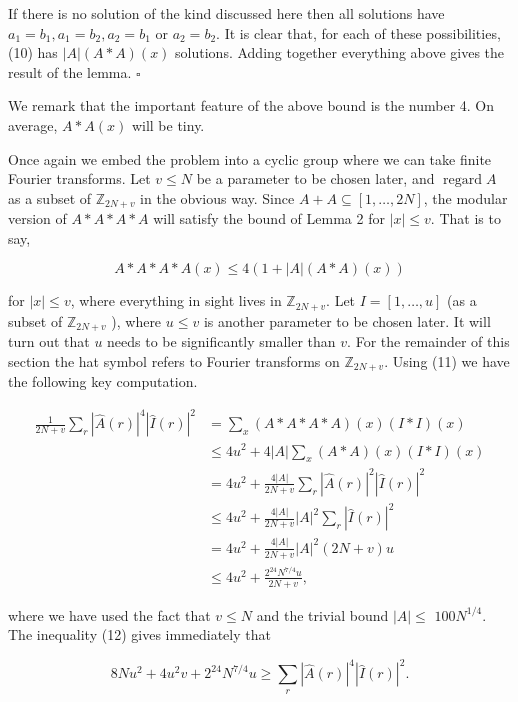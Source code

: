 \documentclass[10pt]{article}
\begin{document}
If there is no solution of the kind discussed here then all solutions have $a_{1}=b_{1}, a_{1}=b_{2}, a_{2}=b_{1}$ or $a_{2}=b_{2}$. It is clear that, for each of these possibilities, (10) has $|A|(A * A)(x)$ solutions. Adding together everything above gives the result of the lemma. \(\square\)

We remark that the important feature of the above bound is the number 4. On average, $A * A(x)$ will be tiny.

Once again we embed the problem into a cyclic group where we can take finite Fourier transforms. Let $v \leq N$ be a parameter to be chosen later, and $\operatorname{regard} A$ as a subset of $\mathbb{Z}_{2 N+v}$ in the obvious way. Since $A+A \subseteq[1, \ldots, 2 N]$, the modular version of $A * A * A * A$ will satisfy the bound of Lemma 2 for $|x| \leq v$. That is to say,


\begin{equation*}
A * A * A * A(x) \leq 4(1+|A|(A * A)(x)) \tag{11}
\end{equation*}


for $|x| \leq v$, where everything in sight lives in $\mathbb{Z}_{2 N+v}$. Let $I=[1, \ldots, u]$ (as a subset of $\mathbb{Z}_{2 N+v}$ ), where $u \leq v$ is another parameter to be chosen later. It will turn out that $u$ needs to be significantly smaller than $v$. For the remainder of this section the hat symbol refers to Fourier transforms on $\mathbb{Z}_{2 N+v}$. Using (11) we have the following key computation.


\begin{align*}
\frac{1}{2 N+v} \sum_{r}|\hat{A}(r)|^{4}|\hat{I}(r)|^{2} & =\sum_{x}(A * A * A * A)(x)(I * I)(x) \\
& \leq 4 u^{2}+4|A| \sum_{x}(A * A)(x)(I * I)(x) \\
& =4 u^{2}+\frac{4|A|}{2 N+v} \sum_{r}|\hat{A}(r)|^{2}|\hat{I}(r)|^{2} \\
& \leq 4 u^{2}+\frac{4|A|}{2 N+v}|A|^{2} \sum_{r}|\hat{I}(r)|^{2} \\
& =4 u^{2}+\frac{4|A|}{2 N+v}|A|^{2}(2 N+v) u \\
& \leq 4 u^{2}+\frac{2^{24} N^{7 / 4} u}{2 N+v}, \tag{12}
\end{align*}


where we have used the fact that $v \leq N$ and the trivial bound $|A| \leq$ $100 N^{1 / 4}$. The inequality (12) gives immediately that


\begin{equation*}
8 N u^{2}+4 u^{2} v+2^{24} N^{7 / 4} u \geq \sum_{r}|\hat{A}(r)|^{4}|\hat{I}(r)|^{2} . \tag{13}
\end{equation*}
\end{document}
